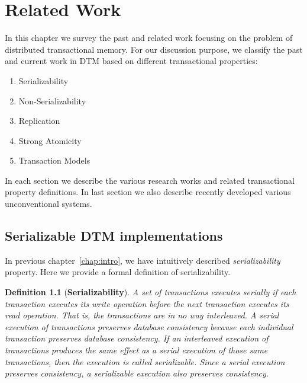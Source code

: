 \documentclass[12pt,english]{report}
\newtheorem{definition}{Definition}[section]
\begin{document}
\chapter{Related Work}\label{chap:relWork}

In this chapter we survey the past and related work focusing on the problem of distributed transactional memory. For our discussion purpose, we classify the past and current work in DTM based on different transactional properties:

\begin{enumerate}
\item Serializability
\item Non-Serializability 
\item Replication 
\item Strong Atomicity
\item Transaction Models
\end{enumerate}

In each section we describe the various research works and related transactional property definitions. In last section we also describe recently developed various unconventional systems.

\section{Serializable DTM implementations}

In previous chapter~\ref{chap:intro}, we have intuitively described \textit{serializability} property. Here we provide a formal definition of serializability. 

\begin{definition}[\textbf{Serializability}]
A set of transactions executes serially if each transaction executes its write operation before the next transaction executes its read operation. That is, the transactions are in no way interleaved. A serial execution of transactions preserves database consistency because each individual transaction preserves
database consistency. If an interleaved execution of transactions produces the same effect as a serial execution of those same transactions, then the execution is called serializable. Since a serial execution preserves consistency, a serializable execution also preserves consistency.~\cite{serializabilityFormal}
\end{definition}
\end{document}
